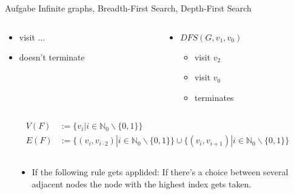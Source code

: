 \begin{frame}[allowframebreaks]{Aufgabe \thesection}{Infinite graphs, Breadth-First Search, Depth-First Search}
\begin{solution}
\begin{columns}
\begin{column}[t]{0.5\textwidth}
\begin{columns}
\begin{column}[t]{0.5\linewidth}
\begin{itemize}
\begin{itemize}
                \item visit $\ldots$
                \item doesn't terminate
              \end{itemize}
            \end{itemize}
          \end{column}
          \begin{column}[t]{0.5\linewidth}
            \begin{itemize}
              \item $DFS(G, v_1, v_0)$
              \begin{itemize}
                \item visit $v_2$
                \item visit $v_0$
                \item terminates
              \end{itemize}
            \end{itemize}
          \end{column}
        \end{columns}
      \end{column}
    \end{columns}
  \end{solution}
  \begin{exercisenoinc}
    \begin{align*}
      V(F) &:= \{v_i | i \in \mathbb{N}_0\backslash\{0,1\}\}\\
      E(F) &:= \{(v_i,v_{i\cdot 2})| i\in \mathbb{N}_0\backslash\{0,1\}\} \cup \{(v_i,v_{i+1})|i \in \mathbb{N}_0\backslash\{0,1\}\}
    \end{align*} 
  \end{exercisenoinc}
  \begin{solutionnoinc}
    \begin{columns}
      \begin{column}[t]{0.45\textwidth}
      \end{column}
      \begin{column}[t]{0.5\textwidth}
        \vspace{0.25cm}
        \begin{itemize}
          \item \alert{If the following rule gets applided:} If there's a choice between several adjacent nodes the node with the highest index gets taken.

\end{itemize}
\end{column}
\end{columns}
\end{solutionnoinc}
\end{frame}

